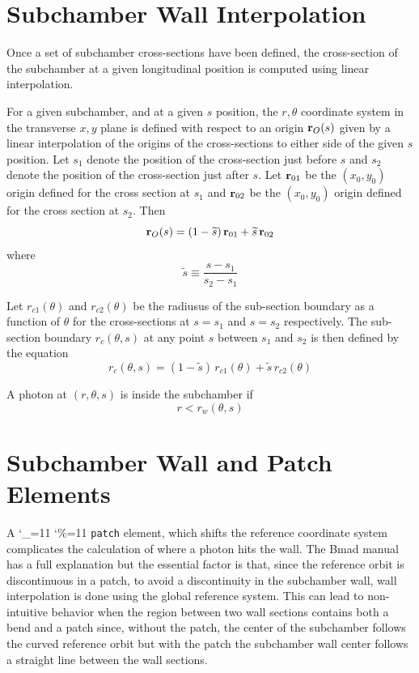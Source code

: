 \documentclass[11pt,openany]{report}
\newcommand\ttcmd{\begingroup\catcode`\_=11 \catcode`\%=11 \dottcmd}
\newcommand\dottcmd[1]{\texttt{#1}\endgroup}
\newcommand{\Begineq}{\begin{equation}}
\newcommand{\Endeq}{\end{equation}}
\newcommand{\vn}{\ttcmd}
\newcommand{\Bf}[1]{{\bf #1}}
\newcommand{\bfr}{\Bf r}
\newcommand{\stilde}{{\widetilde s}}
\begin{document}
\section{Subchamber Wall Interpolation} 
\label{s:wall}

Once a set of subchamber cross-sections have been defined, the
cross-section of the subchamber at a given longitudinal position is
computed using linear interpolation. 

For a given subchamber, and 
at a given $s$ position, the $r, \theta$ coordinate system in the
transverse $x, y$ plane is defined with respect to an origin
$\bfr_O(s)$ given by a linear interpolation of the origins of the
cross-sections to either side of the given $s$ position. Let $s_1$
denote the position of the cross-section just before $s$ and $s_2$
denote the position of the cross-section just after $s$. Let
$\bfr_{01}$ be the $(x_0, y_0)$ origin defined for the cross section
at $s_1$ and $\bfr_{02}$ be the $(x_0, y_0)$ origin defined for the
cross section at $s_2$. Then
\Begineq
  \bfr_O(s) = (1 - \stilde) \, \bfr_{01} + \stilde \, \bfr_{02}
\Endeq
where 
\Begineq
  \stilde \equiv \frac{s - s_1}{s_2 - s_1}
\Endeq

Let $r_{c1}(\theta)$ and $r_{c2}(\theta)$ be the radiusus of the
sub-section boundary as a function of $\theta$ for the cross-sections
at $s = s_1$ and $s = s_2$ respectively. The sub-section boundary
$r_c(\theta, s)$ at any point $s$ between $s_1$ and $s_2$ is then
defined by the equation
\Begineq
  r_c(\theta, s) = (1 - \stilde) \, r_{c1}(\theta) + \stilde \, r_{c2}(\theta)
\Endeq

A photon at $(r,\theta, s)$ is inside the subchamber if
\Begineq
  r < r_w(\theta, s)
\Endeq

\section{Subchamber Wall and Patch Elements}
\label{s:patch}

A \vn{patch} element, which shifts the reference coordinate system
complicates the calculation of where a photon hits the wall. The Bmad
manual has a full explanation but the essential factor is that, since
the reference orbit is discontinuous in a patch, to avoid a
discontinuity in the subchamber wall, wall interpolation is done using
the global reference system. This can lead to non-intuitive behavior
when the region between two wall sections contains both a bend and a
patch since, without the patch, the center of the subchamber follows the
curved reference orbit but with the patch the subchamber wall center
follows a straight line between the wall sections.
\end{document}
